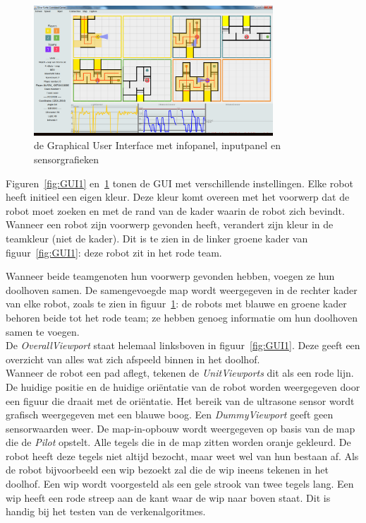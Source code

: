 \documentclass[eind]{penoverslag}
\begin{document}
\begin{figure}[h] %
\centering
	\includegraphics[width=0.8\textwidth]{guiALL}
\caption{de Graphical User Interface met infopanel, inputpanel en sensorgrafieken}
\label{fig:GUI2}
\end{figure}

Figuren~\ref{fig:GUI1} en~\ref{fig:GUI2} tonen de GUI met verschillende instellingen. Elke robot heeft initieel een eigen kleur. Deze kleur komt overeen met het voorwerp dat de robot moet zoeken en met de rand van de kader waarin de robot zich bevindt. Wanneer een robot zijn voorwerp gevonden heeft, verandert zijn kleur in de teamkleur (niet de kader). Dit is te zien in de linker groene kader van figuur~\ref{fig:GUI1}: deze robot zit in het rode team.

Wanneer beide teamgenoten hun voorwerp gevonden hebben, voegen ze hun doolhoven samen. De samengevoegde map wordt weergegeven in de rechter kader van elke robot, zoals te zien in figuur~\ref{fig:GUI2}: de robots met blauwe en groene kader behoren beide tot het rode team; ze hebben genoeg informatie om hun doolhoven samen te voegen.\\
De \textit{OverallViewport} staat helemaal linksboven in figuur~\ref{fig:GUI1}. Deze geeft een overzicht van alles wat zich afspeeld binnen in het doolhof.\\

Wanneer de robot een pad aflegt, tekenen de \textit{UnitViewports} dit als een rode lijn. De huidige positie en de huidige ori\"entatie van de robot worden weergegeven door een figuur die draait met de ori\"entatie. Het bereik van de ultrasone sensor wordt grafisch weergegeven met een blauwe boog. Een \textit{DummyViewport} geeft geen sensorwaarden weer. De map-in-opbouw wordt weergegeven op basis van de map die de \textit{Pilot} opstelt. Alle tegels die in de map zitten worden oranje gekleurd. De robot heeft deze tegels niet altijd bezocht, maar weet wel van hun bestaan af. Als de robot bijvoorbeeld een wip bezoekt zal die de wip ineens tekenen in het doolhof. Een wip wordt voorgesteld als een gele strook van twee tegels lang. Een wip heeft een rode streep aan de kant waar de wip naar boven staat. Dit is handig bij het testen van de verkenalgoritmes.\\
\end{document}

